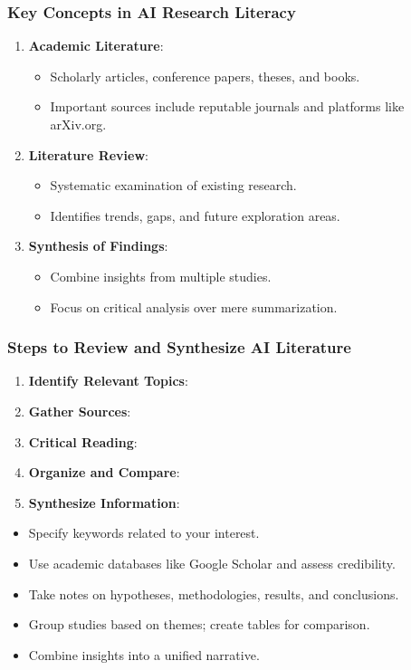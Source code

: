 \documentclass{beamer}
\begin{document}
\begin{frame}[fragile]
    \frametitle{Key Concepts in AI Research Literacy}
    \begin{enumerate}
        \item \textbf{Academic Literature}:
            \begin{itemize}
                \item Scholarly articles, conference papers, theses, and books.
                \item Important sources include reputable journals and platforms like arXiv.org.
            \end{itemize}
        
        \item \textbf{Literature Review}:
            \begin{itemize}
                \item Systematic examination of existing research.
                \item Identifies trends, gaps, and future exploration areas.
            \end{itemize}
            
        \item \textbf{Synthesis of Findings}:
            \begin{itemize}
                \item Combine insights from multiple studies.
                \item Focus on critical analysis over mere summarization.
            \end{itemize}
    \end{enumerate}
\end{frame}

\begin{frame}[fragile]
    \frametitle{Steps to Review and Synthesize AI Literature}
    \begin{enumerate}
        \item \textbf{Identify Relevant Topics}:
        \item \textbf{Gather Sources}:
        \item \textbf{Critical Reading}:
        \item \textbf{Organize and Compare}:
        \item \textbf{Synthesize Information}:
    \end{enumerate}

    \begin{itemize}
        \item Specify keywords related to your interest.
        \item Use academic databases like Google Scholar and assess credibility.
        \item Take notes on hypotheses, methodologies, results, and conclusions.
        \item Group studies based on themes; create tables for comparison.
        \item Combine insights into a unified narrative.
    \end{itemize}
\end{frame}
\end{document}
